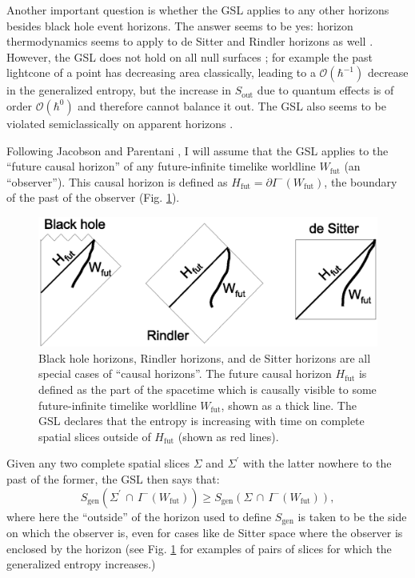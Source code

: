 \documentclass{article}
\begin{document}
Another important question is whether the GSL applies to any other horizons besides black hole event horizons.  The answer seems to be yes: horizon thermodynamics seems to apply to de Sitter and Rindler horizons as well \cite{JP, myproofs}.  However, the GSL does not hold on all null surfaces \cite{10proofs}; for example the past lightcone of a point has decreasing area classically, leading to a $\mathcal{O}(\hbar^{-1})$ decrease in the generalized entropy, but the increase in $S_\mathrm{out}$ due to quantum effects is of order $\mathcal{O}(\hbar^{0})$ and therefore cannot balance it out.  The GSL also seems to be violated semiclassically on apparent horizons \cite{FPSTap}.

Following Jacobson and Parentani \cite{JP}, I will assume that the GSL applies to the ``future causal horizon'' of any future-infinite timelike worldline $W_\mathrm{fut}$ (an ``observer'').  This causal horizon is defined as $H_\mathrm{fut} = \partial I^-(W_\mathrm{fut})$, the boundary of the past of the observer (Fig. \ref{Wfut}).

\begin{figure}[hbt]
\centering
\includegraphics[width=.75\textwidth]{Wfut.eps}
\caption{\small{Black hole horizons, Rindler horizons, and de Sitter horizons are all special cases of ``causal horizons''.  The future causal horizon $H_\mathrm{fut}$ is defined as the part of the spacetime which is causally visible to some future-infinite timelike worldline $W_\mathrm{fut}$, shown as a thick line.  The GSL declares that the entropy is increasing with time on complete spatial slices outside of $H_\mathrm{fut}$ (shown as red lines).
}}\label{Wfut}
\end{figure}

Given any two complete spatial slices $\Sigma$ and $\Sigma^\prime$ with the latter nowhere to the past of the former, the GSL then says that:
\begin{equation}
S_{\mathrm{gen}}(\Sigma^\prime\,\cap\,I^-(W_\mathrm{fut})) \ge S_{\mathrm{gen}}(\Sigma\,\cap\,I^-(W_\mathrm{fut})),
\end{equation}
where here the ``outside'' of the horizon used to define $S_{\mathrm{gen}}$ is taken to be the  side on which the observer is, even for cases like de Sitter space where the observer is enclosed by the horizon (see Fig. \ref{Wfut} for examples of pairs of  slices for which the generalized entropy increases.)
\end{document}
